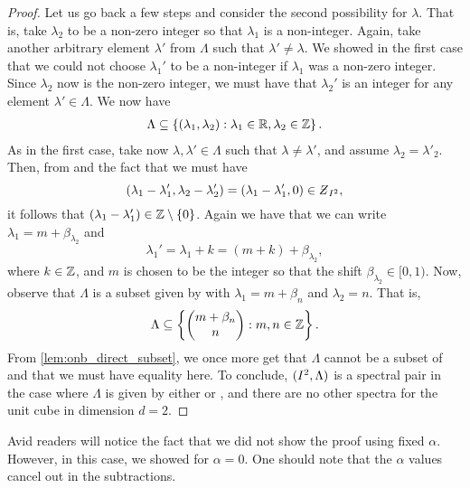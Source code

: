 \documentclass[../thesis.tex]{subfiles}
\begin{document}
\begin{proof}
    Let us go back a few steps and consider the second possibility for $\lambda$. That is, take $\lambda_2$ to be a non-zero integer so that $\lambda_1$ is a non-integer. Again, take another arbitrary element $\lambda'$ from $\Lambda$ such that $\lambda'\neq \lambda$. We showed in the first case that we could not choose $\lambda_1'$ to be a non-integer if $\lambda_1$ was a non-zero integer. Since $\lambda_2$ now is the non-zero integer, we must have that $\lambda_2'$ is an integer for any element $\lambda'\in \Lambda$. We now have
    \begin{align*}
        \Lambda \subseteq \left\{ \left(\lambda_1, \lambda_2\right) : \lambda_1 \in \mathbb{R}, \lambda_2 \in \mathbb{Z}\right\}.
    \end{align*}
    As in the first case, take now $\lambda, \lambda' \in \Lambda$ such that $\lambda\neq \lambda'$, and assume $\lambda_2 = \lambda'_2$. Then, from  and the fact that we must have 
    \begin{equation*}
        \brac{\lambda_1-\lambda'_1,\lambda_2-\lambda'_2} = \brac{\lambda_1-\lambda'_1,0}\in \Zstroke_{I^2},
    \end{equation*}
    it follows that $(\lambda_1- \lambda_1') \in \mathbb{Z}\setminus\{0\}$. Again we have that we can write $\lambda_1  = m+\beta_{\lambda_2}$ and 
    \begin{equation*}
        \lambda_1'  = \lambda_1 + k = (m+k) + \beta_{\lambda_2},
    \end{equation*}
    where $k \in \mathbb{Z}$, and $m$ is chosen to be the integer so that the shift $\beta_{\lambda_2} \in [0,1)$. Now, observe that $\Lambda$ is a subset given by  with $\lambda_1 = m + \beta_n$ and $\lambda_2 = n$. That is,
    \begin{equation*}  %
        \Lambda \subseteq \braqMed{\begin{pmatrix} m +\beta_n \\ n\end{pmatrix} : m,n \in \Z}.
    \end{equation*} %
    From \cref{lem:onb_direct_subset}, we once more get that $\Lambda$ cannot be a subset of  and that we must have equality here. To conclude, $(I^2, \Lambda)$ is a spectral pair in the case where $\Lambda$ is given by either  or , and there are no other spectra for the unit cube in dimension $d=2$.
\end{proof}

\begin{remark}
    Avid readers will notice the fact that we did not show the proof using fixed $\alpha$. However, in this case, we showed for $\alpha =0$. One should note that the $\alpha$ values cancel out in the subtractions. 
\end{remark}
\end{document}
